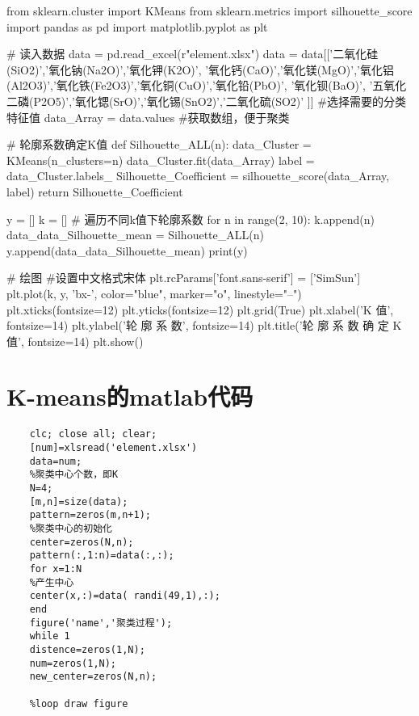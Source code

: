 \documentclass[withoutpreface,bwprint]{cumcmthesis} %
\begin{document}
\begin{appendices}
\begin{python}
	from sklearn.cluster import KMeans
	from sklearn.metrics import silhouette_score
	import pandas as pd
	import matplotlib.pyplot as plt
	
	# 读入数据
	data = pd.read_excel(r"element.xlsx")
	data = data[['二氧化硅(SiO2)','氧化钠(Na2O)','氧化钾(K2O)',	'氧化钙(CaO)','氧化镁(MgO)','氧化铝(Al2O3)','氧化铁(Fe2O3)','氧化铜(CuO)','氧化铅(PbO)', '氧化钡(BaO)', '五氧化二磷(P2O5)','氧化锶(SrO)','氧化锡(SnO2)','二氧化硫(SO2)'
	]]                    #选择需要的分类特征值
	data_Array = data.values           #获取数组，便于聚类
	
	# 轮廓系数确定K值
	def Silhouette_ALL(n):  
	data_Cluster = KMeans(n_clusters=n)
	data_Cluster.fit(data_Array)
	label = data_Cluster.labels_
	Silhouette_Coefficient = silhouette_score(data_Array, label)
	return Silhouette_Coefficient
	
	y = []
	k = []
	# 遍历不同k值下轮廓系数
	for n in range(2, 10):  
	k.append(n)
	data_data_Silhouette_mean = Silhouette_ALL(n)
	y.append(data_data_Silhouette_mean)
	print(y)
	
	# 绘图
	#设置中文格式宋体
	plt.rcParams['font.sans-serif'] = ['SimSun']
	plt.plot(k, y, 'bx-',  color="blue", marker="o", linestyle="--")
	plt.xticks(fontsize=12)
	plt.yticks(fontsize=12)
	plt.grid(True)
	plt.xlabel('K  值', fontsize=14)
	plt.ylabel('轮 廓 系 数', fontsize=14)
	plt.title('轮 廓 系 数 确 定 K 值', fontsize=14)
	plt.show()
	
\end{python}

\section{K-means的matlab代码}
\begin{lstlisting}
	clc; close all; clear;
	[num]=xlsread('element.xlsx')
	data=num; 
	%聚类中心个数，即K
	N=4; 
	[m,n]=size(data);
	pattern=zeros(m,n+1);
	%聚类中心的初始化
	center=zeros(N,n); 
	pattern(:,1:n)=data(:,:);
	for x=1:N
	%产生中心
	center(x,:)=data( randi(49,1),:);
	end
	figure('name','聚类过程');
	while 1
	distence=zeros(1,N);
	num=zeros(1,N);
	new_center=zeros(N,n);
	
	%loop draw figure
	

\end{lstlisting}
\end{appendices}
\end{document}
